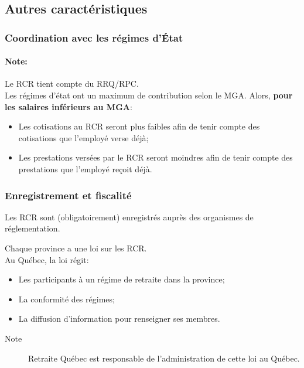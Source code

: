\documentclass[10pt, french]{article}
\begin{document}
\begin{multicols*}{3}
\columnbreak
\subsection{Autres caractéristiques}

\subsubsection*{Coordination avec les régimes d'État}
\paragraph{Note:}	Le RCR tient compte du RRQ/RPC.\\

Les régimes d'état ont un maximum de contribution selon le MGA. Alors, \textbf{pour les salaires inférieurs au MGA}:
\begin{itemize}[leftmargin = *]
	\item	Les cotisations au RCR seront plus faibles afin de tenir compte des cotisations que  l'employé verse déjà;
	\item	Les prestations versées par le RCR seront moindres afin de tenir compte des prestations que l'employé reçoit déjà.
\end{itemize}

\subsubsection*{Enregistrement et fiscalité}
Les RCR sont (obligatoirement) enregistrés auprès des organismes de réglementation.

Chaque province a une loi sur les RCR. \\
Au Québec, la loi régit:
\begin{itemize}[leftmargin = *]
	\item	Les participants à un régime de retraite dans la province;
	\item	La conformité des régimes;
	\item	La diffusion d'information pour renseigner ses membres.
\end{itemize}
\begin{description}
	\item[Note]	Retraite Québec est responsable de l'administration de cette loi au Québec. 
\end{description}

\


\end{multicols*}
\end{document}

